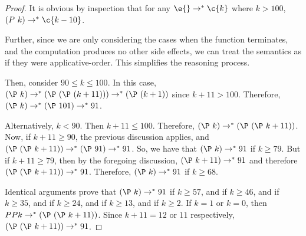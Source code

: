 \documentclass{article}[12pt]
\begin{document}
\begin{proof}

It is obvious by inspection that for any $\e{} \rightarrow^* \c{k}$
where $k > 100$, $(P\ k) \rightarrow^* \c{k-10}$.  

Further, since we are only considering the cases when the function
terminates, and the computation produces no other side effects, we can
treat the semantics as if they were applicative-order.  This
simplifies the reasoning process. 


Then, consider $90 \leq k \leq 100$.  In this case, $\PP{k}
\red \PP{\PP {(k+11)}} \red \PP{(k+1)}$ since $k+11>100$.  Therefore,
$\PP{k} \red \PP{101} \red 91$.

Alternatively, $k < 90$.  Then $k+11 \leq 100$.  Therefore, $\PP{k}
\red \PP{\PP{k+11}}$.  Now, if $k+11 \geq 90$, the previous discussion
applies, and $\PP{\PP{k+11}} \red \PP{91} \red 91$.  So, we have that
$\PP{k} \red 91$ if $k \geq 79$.  But if $k+11 \geq 79$, then  by
the foregoing discussion, $\PP{k+11} \red 91$ and therefore
$\PP{\PP{k+11}} \red 91$.  Therefore, $\PP{k} \red 91$ if $k \geq 68$.

Identical arguments prove that $\PP{k} \red 91$ if $k \geq 57$, and if
$k \geq 46$, and if $k \geq 35$, and if $k \geq 24$, and if $k \geq
13$, and if $k \geq 2$.  If $k = 1$ or $k = 0$, then $PP{k} \red
\PP{\PP{k+11}}$.  Since $k+11 = 12$ or $11$ respectively,
$\PP{\PP{k+11}} \red 91$.  

\end{proof}
\end{document}
